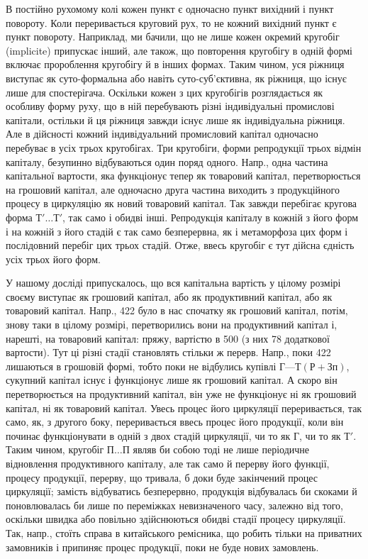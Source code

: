В постійно рухомому колі кожен пункт є одночасно пункт вихідний
і пункт повороту. Коли переривається круговий рух, то не кожний
вихідний пункт є пункт повороту. Наприклад, ми бачили, що не лише
кожен окремий кругобіг (implicite) припускає інший, але також, що
повторення кругобігу в одній формі включає пророблення кругобігу й
в інших формах. Таким чином, уся ріжниця виступає як суто-формальна
або навіть суто-суб’єктивна, як ріжниця, що існує лише для спостерігача.
Оскільки кожен з цих кругобігів розглядається як особливу форму
руху, що в ній перебувають різні індивідуальні промислові капітали, остільки
й ця ріжниця завжди існує лише як індивідуальна ріжниця. Але в дійсності
кожний індивідуальний промисловий капітал одночасно перебуває
в усіх трьох кругобігах. Три кругобіги, форми репродукції трьох відмін
капіталу, безупинно відбуваються один поряд одного. Напр., одна частина
капітальної вартости, яка функціонує тепер як товаровий капітал, перетворюється
на грошовий капітал, але одночасно друга частина виходить
з продукційного процесу в циркуляцію як новий товаровий капітал. Так
завжди перебігає кругова форма $Т'\dots{} Т'$, так само і обидві інші. Репродукція
капіталу в кожній з його форм і на кожній з його стадій
є так само безперервна, як і метаморфоза цих форм і послідовний перебіг
цих трьох стадій. Отже, ввесь кругобіг є тут дійсна єдність усіх трьох
його форм.

У нашому досліді припускалось, що вся капітальна вартість у цілому розмірі
своєму виступає як грошовий капітал, або як продуктивний капітал, або як
товаровий капітал. Напр., 422 було в нас спочатку як грошовий
капітал, потім, знову таки в цілому розмірі, перетворились вони на
продуктивний капітал і, нарешті, на товаровий капітал: пряжу, вартістю
в 500 (з них 78 додаткової вартости). Тут ці різні
стадії становлять стільки ж перерв. Напр., поки 422 лишаються
в грошовій формі, тобто поки не відбулись купівлі $Г — Т (Р + Зп)$,
сукупний капітал існує і функціонує лише як грошовий капітал. А скоро
він перетворюється на продуктивний капітал, він уже не функціонує ні
як грошовий капітал, ні як товаровий капітал. Увесь процес його циркуляції
переривається, так само, як, з другого боку, переривається ввесь
процес його продукції, коли він починає функціонувати в одній з двох
стадій циркуляції, чи то як $Г$, чи то як $Т'$. Таким чином, кругобіг $П\dots{} П$
являв би собою тоді не лише періодичне відновлення продуктивного
капіталу, але так само й перерву його функції, процесу продукції, перерву,
що тривала, б доки буде закінчений процес циркуляції; замість відбуватись
безперервно, продукція відбувалась би скоками й поновлювалась би лише
по переміжках невизначеного часу, залежно від того, оскільки швидка
або повільно здійснюються обидві стадії процесу циркуляції. Так, напр.,
стоїть справа в китайського ремісника, що робить тільки на приватних
замовників і припиняє процес продукції, поки не буде нових замовлень.

